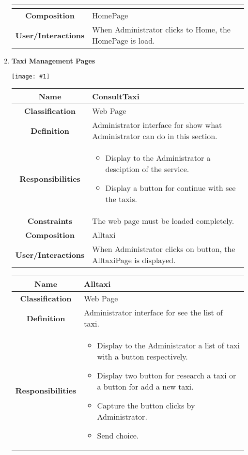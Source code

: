 \documentclass[11pt, a4paper,titlepage]{article}
\newcommand{\image}[1]{
	\begin{center}
		\noindent \texttt{[image: \#1]}
	\end{center}
	}
\begin{document}
\begin{enumerate}
\begin{tabularx}{\textwidth}{| c | X |}
\begin{itemize}
	\end{itemize}
	\\
	\hline
	\textbf{Composition} & HomePage
	\\
	\hline
	\textbf{User/Interactions} & When Administrator clicks to Home, the HomePage is load.
	\\
	\hline 
\end{tabularx}
\newpage
\item \textbf{Taxi Management Pages}\\
\image{page_taximanagement.png}
\begin{tabularx}{\textwidth}{| c | X |}
	\hline
	\textbf{Name} &
	ConsultTaxi
	\\
	\hline
	\textbf{Classification} &
	Web Page
	\\
	\hline
	\textbf{Definition} &
	Administrator interface for show what Administrator can do in this section.\\
	\hline
	\textbf{Responsibilities} &
	\begin{itemize}
		\item Display to the Administrator a desciption of the service.
		\item Display a button for continue with see the taxis.
	\end{itemize}
	\\
	\hline
	\textbf{Constraints} & The web page must be loaded completely.
	\\
	\hline
	\textbf{Composition} &
	Alltaxi
	\\
	\hline
	\textbf{User/Interactions} &
	When Administrator clicks on button, the AlltaxiPage is displayed.
	\\
	\hline 
\end{tabularx}
\begin{tabularx}{\textwidth}{| c | X |}
	\hline
	\textbf{Name} &
	Alltaxi
	\\
	\hline
	\textbf{Classification} &
	Web Page
	\\
	\hline
	\textbf{Definition} &
	Administrator interface for see the list of taxi.\\
	\hline
	\textbf{Responsibilities} &
	\begin{itemize}
		\item Display to the Administrator a list of taxi with a button respectively.
		\item Display two button for research a taxi or a button for add a new taxi.
		\item  Capture the button clicks by Administrator.
		\item Send choice.

\end{itemize}
\end{tabularx}
\end{enumerate}
\end{document}
